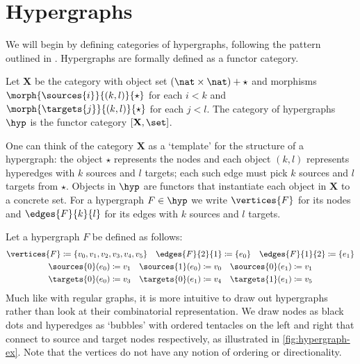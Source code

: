 \section{Hypergraphs}

We will begin by defining categories of hypergraphs, following the
pattern outlined in \cite{bonchi2022string}.
Hypergraphs are formally defined as a functor category.

\begin{definition}\label{def:hypergraph}
    Let \(\mathbf{X}\) be the category with object set
    \((\nat \times \nat) + \star\) and morphisms
    \(\morph{\sources{i}}{(k,l)}{\star}\) for each \(i < k\)
    and \(\morph{\targets{j}}{(k,l)}{\star}\) for each \(j < l\).
    The category of hypergraphs \(\hyp\) is the functor category
    \([\mathbf{X}, \set]\).
\end{definition}

One can think of the category \(\mathbf{X}\) as a `template' for the structure
of a hypergraph: the object \(\star\) represents the nodes and each object
\((k, l)\) represents hyperedges with \(k\) sources and \(l\) targets; each such
edge must pick \(k\) sources and \(l\) targets from \(\star\).
Objects in \(\hyp\) are functors that instantiate each object in \(\mathbf{X}\)
to a concrete set.
For a hypergraph \(F \in \hyp\) we write \(\vertices{F}\) for its nodes and
\(\edges{F}{k}{l}\) for its edges with \(k\) sources and \(l\) targets.

\begin{example}\label{ex:hypergraph}
    Let a hypergraph \(F\) be defined as follows:
    \begin{gather*}
        \vertices{F} \coloneqq \{v_0,v_1,v_2,v_3,v_4,v_5\}
        \quad
        \edges{F}{2}{1} \coloneqq \{e_0\}
        \quad
        \edges{F}{1}{2} \coloneqq \{e_1\}
        \\
        \sources{0}(e_0) \coloneqq v_1
        \quad
        \sources{1}(e_0) \coloneqq v_0
        \quad
        \sources{0}(e_1) \coloneqq v_1
        \\
        \targets{0}(e_0) \coloneqq v_3
        \quad
        \targets{0}(e_1) \coloneqq v_4
        \quad
        \targets{1}(e_1) \coloneqq v_5
    \end{gather*}
    Much like with regular graphs, it is more intuitive to draw out hypergraphs
    rather than look at their combinatorial representation.
    We draw nodes as black dots and hyperedges as `bubbles' with ordered tentacles
    on the left and right that connect to source and target nodes respectively,
    as illustrated in \cref{fig:hypergraph-ex}.
    Note that the vertices do not have any notion of ordering or directionality.
\end{example}

